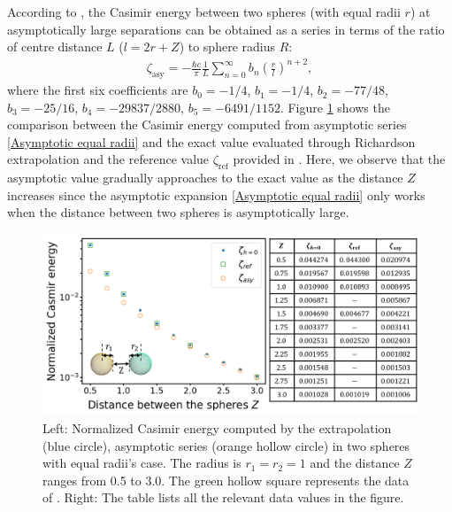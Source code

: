 According to \cite{emig2008casimir}, the Casimir energy between two spheres (with equal radii $r$) at asymptotically 
large separations can be obtained as a series in terms of the ratio of centre distance $L$ ($l = 2r + Z$) to sphere radius $R$:
\begin{align}\label{Asymptotic equal radii}
   \zeta_{\text{asy}} = -\frac{\hbar c}{\pi}\frac{1}{L}\sum_{n=0}^{\infty}b_{n}\left(\frac{r}{l}\right)^{n+2},
\end{align}
where the first six coefficients are 
$b_{0} = -1/4$, $b_{1} = -1/4$,  $b_{2} = -77/48$,  $b_{3} = -25/16$,  $b_{4} = -29837/2880$, $b_{5} = -6491/1152$. Figure 
\ref{Casimir energy between spheres with equal radii} shows the comparison between the Casimir energy computed from asymptotic series 
\eqref{Asymptotic equal radii} and the exact value evaluated through Richardson extrapolation and the reference value $\zeta_{\text{ref}}$ provided in \cite[Equation (64)]{kenneth2008casimir}. Here, we observe that the asymptotic value gradually 
approaches to the exact value as the distance $Z$ increases since the asymptotic expansion \eqref{Asymptotic equal radii} only works when the distance 
between two spheres is asymptotically large.

\begin{figure}[H]
    \centering
    \includegraphics[width = \textwidth]{figures/Scalar_sp_equal_CasE.png}
    \caption[Caption for LOF]{{\color{gray}Left:} Normalized Casimir energy  \protect\footnotemark computed by the extrapolation (blue circle), asymptotic series (orange hollow circle) in two spheres with equal radii's case. The radius is $r_{1} = r_{2} = 1$ and the distance $Z$ 
    ranges from 0.5 to 3.0. The green hollow square represents the data of \cite{kenneth2008casimir}. {\color{gray}Right:} The table lists all the relevant data values in the figure.}
    \label{Casimir energy between spheres with equal radii}
\end{figure}

